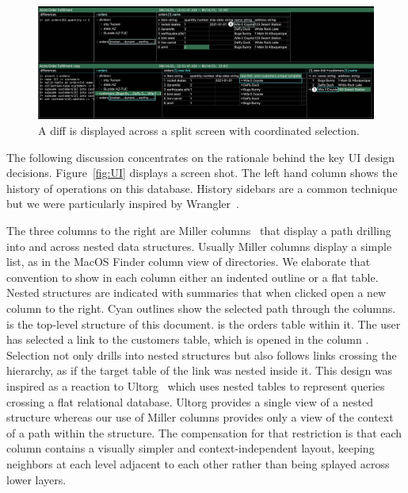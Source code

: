 \documentclass[english,submission]{programming}
\theoremstyle{definition}
\begin{document}
\begin{figure}
\includegraphics[width=\textwidth]{DiffNumbered.png}
\caption{A diff is displayed across a split screen with coordinated selection.}
\label{fig:Diff}
\end{figure}


The following discussion concentrates on the rationale behind the key UI design decisions.
Figure~\ref{fig:UI} displays a screen shot.  The left hand column shows the history of operations on this database. History sidebars are a common technique but we were particularly inspired by Wrangler~\cite{kandel11}.

The three columns to the right are Miller columns~\cite{miller-columns} that display a path drilling into and across nested data structures. Usually Miller columns display a simple list, as in the MacOS Finder column view of directories. We elaborate that convention to show in each column either an indented outline or a flat table. Nested structures are indicated with summaries that when clicked open a new column to the right. Cyan outlines show the selected path through the columns.  is the top-level structure of this document.  is the \textsf{orders} table within it. The user has selected a link to the \textsf{customers} table, which is opened in the column . Selection not only drills into nested structures but also follows links crossing the hierarchy, as if the target table of the link was nested inside it. This design was inspired as a reaction to Ultorg~\cite{bakke:phdthesis, ultorg} which uses nested tables to represent queries crossing a flat relational database. Ultorg provides a single view of a nested structure whereas our use of Miller columns provides only a view of the context of a path within the structure. The compensation for that restriction is that each column contains a visually simpler and context-independent layout, keeping neighbors at each level adjacent to each other rather than being splayed across lower layers.
\end{document}
